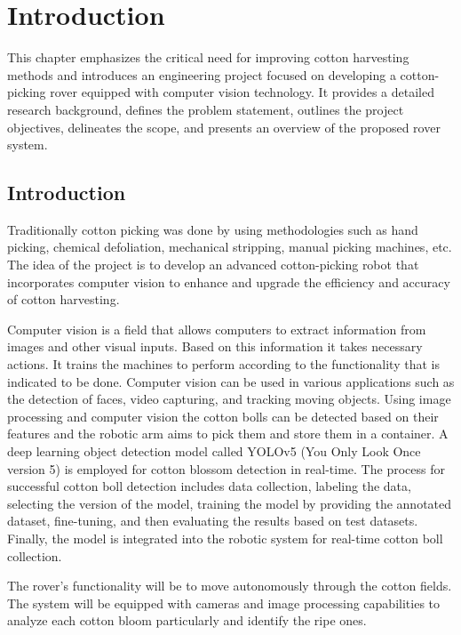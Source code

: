 \documentclass[12pt,a4paper]{report}
\begin{document}


\chapter{Introduction}
\hspace{6pt}
\par This chapter emphasizes the critical need for improving cotton harvesting methods and introduces an engineering project focused on developing a cotton-picking rover equipped with computer vision technology. It provides a detailed research background, defines the problem statement, outlines the project objectives, delineates the scope, and presents an overview of the proposed rover system.


\section{Introduction}
\par Traditionally cotton picking was done by using methodologies such as hand picking, chemical defoliation, mechanical stripping, manual picking machines, etc. The idea of the project is to develop an advanced cotton-picking robot that incorporates computer vision to enhance and upgrade the efficiency and accuracy of cotton harvesting. 
\par Computer vision is a field that allows computers to extract information from images and other visual inputs. Based on this information it takes necessary actions. It trains the machines to perform according to the functionality that is indicated to be done. Computer vision can be used in various applications such as the detection of faces, video capturing, and tracking moving objects. Using image processing and computer vision the cotton bolls can be detected based on their features and the robotic arm aims to pick them and store them in a container. A deep learning object detection model called YOLOv5 (You Only Look Once version 5) is employed for cotton blossom detection in real-time. The process for successful cotton boll detection includes data collection, labeling the data, selecting the version of the model, training the model by providing the annotated dataset, fine-tuning, and then evaluating the results based on test datasets. Finally, the model is integrated into the robotic system for real-time cotton boll collection.
\par The rover’s functionality will be to move autonomously through the cotton fields. The system will be equipped with cameras and image processing capabilities to analyze each cotton bloom particularly and identify the ripe ones.
\end{document}
